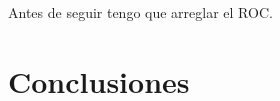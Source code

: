 \documentclass[12pt]{article}
\begin{document}
Antes de seguir tengo que arreglar el ROC.


\section{Conclusiones}





\end{document}
